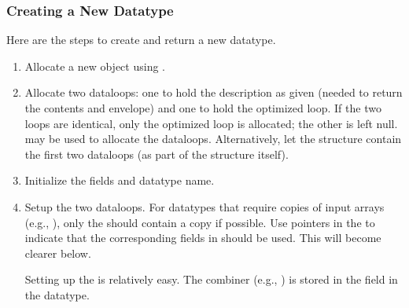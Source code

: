 \documentclass{article}
\begin{document}
\subsubsection{Creating a New Datatype}
Here are the steps to create and return a new datatype.
\begin{enumerate}
\item Allocate a new object using .

\item Allocate two dataloops: one to hold the description as given (needed to
  return the contents and envelope) and one to hold the optimized loop.
  If the two loops are identical, only the optimized loop is allocated; the
  other is left null.   may be used to allocate the
  dataloops.  Alternatively, let the  structure
  contain the first two dataloops (as part of the structure itself).

\item Initialize the fields and datatype name.

\item Setup the two dataloops.  For datatypes that require copies of input
  arrays (e.g., ), only the
   should contain a copy if possible.  
  Use  pointers in the  to indicate
  that the corresponding fields in  should
  be used.  This will become clearer below.
  
  Setting up the  is relatively easy.  The combiner (e.g.,
  ) is stored in the
   field in the 
  datatype.  


\end{enumerate}
\end{document}
